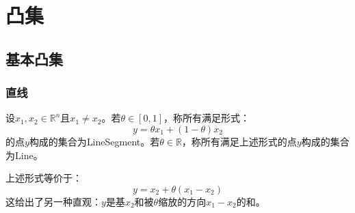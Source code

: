 \section{凸集}

\subsection{基本凸集}
\subsubsection{直线}
\begin{definition}
	设$x_1,x_2\in\mathbb{R}^{n}$且$x_1\ne x_2$。若$\theta\in[0,1]$，称所有满足形式：
	\begin{equation*}
		y=\theta x_1+(1-\theta)x_2
	\end{equation*}
	的点$y$构成的集合为\gls{LineSegment}。若$\theta\in\mathbb{R}$，称所有满足上述形式的点$y$构成的集合为\gls{Line}。
\end{definition}
\begin{note}
	上述形式等价于：
	\begin{equation*}
		y=x_2+\theta(x_1-x_2)
	\end{equation*}
	这给出了另一种直观：$y$是基$x_2$和被$\theta$缩放的方向$x_1-x_2$的和。
\end{note}
